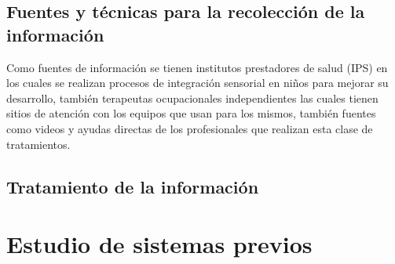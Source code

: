	\subsection{Fuentes y técnicas para la recolección de la información}
		Como fuentes de información se tienen institutos prestadores de salud (IPS) en los cuales se realizan procesos de integración sensorial en niños para mejorar su desarrollo, también terapeutas ocupacionales independientes las cuales tienen sitios de atención con los equipos que usan para los mismos, también fuentes como videos y ayudas directas de los profesionales que realizan esta clase de tratamientos.
	\subsection{Tratamiento de la información}
\newpage
\section{Estudio de sistemas previos}
